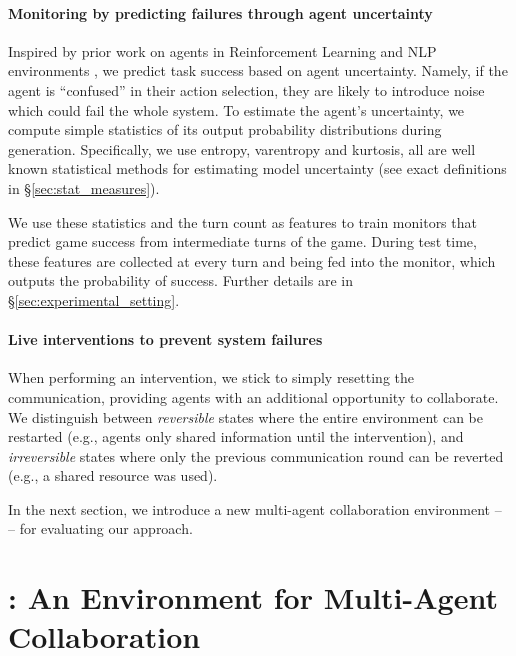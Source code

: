 \paragraph{Monitoring by predicting failures through agent uncertainty}
Inspired by prior work on agents in Reinforcement Learning and NLP environments \cite{acharya2022uncertaintyquantificationcompetencyassessment, liu-etal-2024-uncertainty, doi:10.1126/sciadv.adk1256, debunc}, we predict task success based on agent uncertainty. Namely, if the agent is ``confused'' in their action selection, they are likely to introduce noise which could fail the whole system. To estimate the agent's uncertainty, we compute simple statistics of its output probability distributions during generation. Specifically, we use entropy, varentropy and kurtosis, all are well known statistical methods for estimating model uncertainty (see exact definitions in \S\ref{sec:stat_measures}).

We use these statistics and the turn count as features to train monitors that predict game success from intermediate turns of the game. During test time, these features are collected at every turn and being fed into the monitor, which outputs the probability of success. Further details are in \S\ref{sec:experimental_setting}.


\paragraph{Live interventions to prevent system failures}
When performing an intervention, we stick to simply resetting the communication, providing agents with an additional opportunity to collaborate. 
We distinguish between \emph{reversible} states where the entire environment can be restarted (e.g., agents only shared information until the intervention), and \emph{irreversible} states where only the previous communication round can be reverted (e.g., a shared resource was used).


In the next section, we introduce a new multi-agent collaboration environment -- \ourenv{} -- for evaluating our approach.


\section{\ourenv{}: An Environment for Multi-Agent Collaboration}
\label{sec:env}

